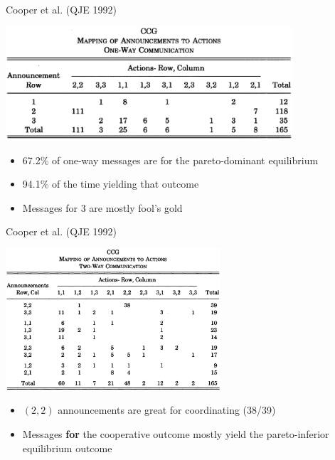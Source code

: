 \documentclass{beamer}
\begin{document}
\begin{frame}{Cooper et al. (QJE 1992)}
\begin{card}
\begin{center}\includegraphics[width=0.8\textwidth]{./i/cdfr1992Tbl5.eps}\end{center}
\end{card}
\begin{card}
	\begin{itemize}
		\item 67.2\% of one-way messages are for the pareto-dominant equilibrium
		\item 94.1\% of the time yielding that outcome
		\item Messages for 3 are mostly fool's gold
	\end{itemize}
\end{card}
\end{frame}

\begin{frame}{Cooper et al. (QJE 1992)}
\begin{card}
\begin{center}\includegraphics[width=0.6\textwidth]{./i/cdfr1992Tbl6.eps}\end{center}
\end{card}
\begin{card}
	\begin{itemize}
		\item $(2,2)$ announcements are great for coordinating (38/39)
		\item Messages \textbf{for} the cooperative outcome mostly yield the pareto-inferior equilibrium outcome
	\end{itemize}
	\end{card}
\end{frame}
\end{document}
